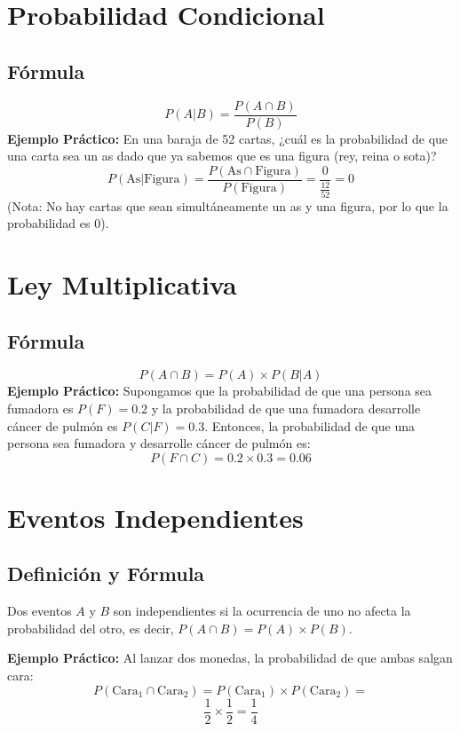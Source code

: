 \documentclass[10pt]{article}
\begin{document}
\begin{multicols}{2}
		\section*{Probabilidad Condicional}
		
		\subsection*{Fórmula}
		\[
		P(A|B) = \frac{P(A \cap B)}{P(B)}
		\]
		\textbf{Ejemplo Práctico:}  
		En una baraja de 52 cartas, ¿cuál es la probabilidad de que una carta sea un as dado que ya sabemos que es una figura (rey, reina o sota)?  
		\[
		P(\text{As}|\text{Figura}) = \frac{P(\text{As} \cap \text{Figura})}{P(\text{Figura})} = \frac{0}{\frac{12}{52}} = 0
		\]
		(Nota: No hay cartas que sean simultáneamente un as y una figura, por lo que la probabilidad es 0).
		
		\section*{Ley Multiplicativa}
		
		\subsection*{Fórmula}
		\[
		P(A \cap B) = P(A) \times P(B|A)
		\]
		\textbf{Ejemplo Práctico:}  
		Supongamos que la probabilidad de que una persona sea fumadora es \( P(F) = 0.2 \) y la probabilidad de que una fumadora desarrolle cáncer de pulmón es \( P(C|F) = 0.3 \). Entonces, la probabilidad de que una persona sea fumadora y desarrolle cáncer de pulmón es:
		\[
		P(F \cap C) = 0.2 \times 0.3 = 0.06
		\]
		
		\section*{Eventos Independientes}
		
		\subsection*{Definición y Fórmula}
		Dos eventos \( A \) y \( B \) son independientes si la ocurrencia de uno no afecta la probabilidad del otro, es decir, \( P(A \cap B) = P(A) \times P(B) \).
		
		\textbf{Ejemplo Práctico:}  
		Al lanzar dos monedas, la probabilidad de que ambas salgan cara:
		\[
		P(\text{Cara}_1 \cap \text{Cara}_2) = P(\text{Cara}_1) \times P(\text{Cara}_2) = 
		\]
		\[
		\frac{1}{2} \times \frac{1}{2} = \frac{1}{4}
		\]
		

\end{multicols}
\end{document}

